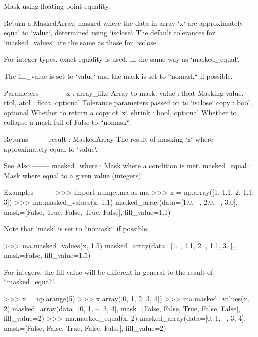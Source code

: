 \begin{DoxyVerb}Mask using floating point equality.

Return a MaskedArray, masked where the data in array `x` are approximately
equal to `value`, determined using `isclose`. The default tolerances for
`masked_values` are the same as those for `isclose`.

For integer types, exact equality is used, in the same way as
`masked_equal`.

The fill_value is set to `value` and the mask is set to ``nomask`` if
possible.

Parameters
----------
x : array_like
    Array to mask.
value : float
    Masking value.
rtol, atol : float, optional
    Tolerance parameters passed on to `isclose`
copy : bool, optional
    Whether to return a copy of `x`.
shrink : bool, optional
    Whether to collapse a mask full of False to ``nomask``.

Returns
-------
result : MaskedArray
    The result of masking `x` where approximately equal to `value`.

See Also
--------
masked_where : Mask where a condition is met.
masked_equal : Mask where equal to a given value (integers).

Examples
--------
>>> import numpy.ma as ma
>>> x = np.array([1, 1.1, 2, 1.1, 3])
>>> ma.masked_values(x, 1.1)
masked_array(data=[1.0, --, 2.0, --, 3.0],
             mask=[False,  True, False,  True, False],
       fill_value=1.1)

Note that `mask` is set to ``nomask`` if possible.

>>> ma.masked_values(x, 1.5)
masked_array(data=[1. , 1.1, 2. , 1.1, 3. ],
             mask=False,
       fill_value=1.5)

For integers, the fill value will be different in general to the
result of ``masked_equal``.

>>> x = np.arange(5)
>>> x
array([0, 1, 2, 3, 4])
>>> ma.masked_values(x, 2)
masked_array(data=[0, 1, --, 3, 4],
             mask=[False, False,  True, False, False],
       fill_value=2)
>>> ma.masked_equal(x, 2)
masked_array(data=[0, 1, --, 3, 4],
             mask=[False, False,  True, False, False],
       fill_value=2)\end{DoxyVerb}
 \mbox{\label{namespacenumpy_1_1ma_1_1core_ac0e3a7db34bc11b3b4ca72a1b2702a7c}} 

